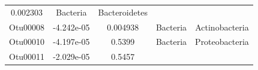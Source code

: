 \documentclass[]{article}
\begin{document}
\begin{longtable}[]{@{}ccccc@{}}
\begin{minipage}[t]{0.14\columnwidth}
0.002303\strut
\end{minipage} & \begin{minipage}[t]{0.13\columnwidth}\centering\strut
Bacteria\strut
\end{minipage} & \begin{minipage}[t]{0.20\columnwidth}\centering\strut
Bacteroidetes\strut
\end{minipage}\tabularnewline
\begin{minipage}[t]{0.13\columnwidth}\centering\strut
Otu00008\strut
\end{minipage} & \begin{minipage}[t]{0.16\columnwidth}\centering\strut
-4.242e-05\strut
\end{minipage} & \begin{minipage}[t]{0.14\columnwidth}\centering\strut
0.004938\strut
\end{minipage} & \begin{minipage}[t]{0.13\columnwidth}\centering\strut
Bacteria\strut
\end{minipage} & \begin{minipage}[t]{0.20\columnwidth}\centering\strut
Actinobacteria\strut
\end{minipage}\tabularnewline
\begin{minipage}[t]{0.13\columnwidth}\centering\strut
Otu00010\strut
\end{minipage} & \begin{minipage}[t]{0.16\columnwidth}\centering\strut
-4.197e-05\strut
\end{minipage} & \begin{minipage}[t]{0.14\columnwidth}\centering\strut
0.5399\strut
\end{minipage} & \begin{minipage}[t]{0.13\columnwidth}\centering\strut
Bacteria\strut
\end{minipage} & \begin{minipage}[t]{0.20\columnwidth}\centering\strut
Proteobacteria\strut
\end{minipage}\tabularnewline
\begin{minipage}[t]{0.13\columnwidth}\centering\strut
Otu00011\strut
\end{minipage} & \begin{minipage}[t]{0.16\columnwidth}\centering\strut
-2.029e-05\strut
\end{minipage} & \begin{minipage}[t]{0.14\columnwidth}\centering\strut
0.5457\strut
\end{minipage} & \begin{minipage}[t]{0.13\columnwidth}\centering\strut

\end{minipage}
\end{longtable}
\end{document}
